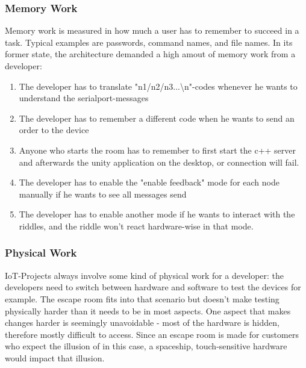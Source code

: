 \subsubsection{Memory Work}
Memory work is measured in how much a user has to remember to succeed in a task. 
Typical examples are passwords, command names, and file names.
In its former state, the architecture demanded a high amout of memory work from a developer:
\begin{enumerate}
    \item The developer has to translate "n1/n2/n3...\textbackslash n"-codes whenever he wants to understand the serialport-messages 
    \item The developer has to remember a different code when he wants to send an order to the device
    \item Anyone who starts the room has to remember to first start the c++ server and afterwards the unity application on the desktop, or connection will fail.
    \item The developer has to enable the "enable feedback" mode for each node manually if he wants to see all messages send
    \item The developer has to enable another mode if he wants to interact with the riddles, and the riddle won't react hardware-wise in that mode.
\end{enumerate} 

\subsubsection{Physical Work}
IoT-Projects always involve some kind of physical work for a developer: the developers need to switch between hardware and software to test the devices for example.
The escape room fits into that scenario but doesn't make testing physically harder than it needs to be in most aspects. 
One aspect that makes changes harder is seemingly unavoidable - most of the hardware is hidden, therefore mostly difficult to access. 
Since an escape room is made for customers who expect the illusion of in this case, a spaceship, 
touch-sensitive hardware would impact that illusion.
